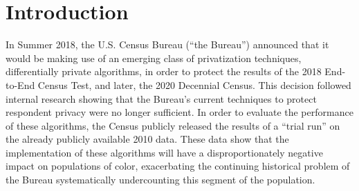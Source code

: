 \section{Introduction} \label{sec:intro}

In Summer 2018, the U.S. Census Bureau (``the Bureau'') announced that it would be making use of an emerging class of privatization techniques, differentially private algorithms, in order to protect the results of the 2018 End-to-End Census Test, and later, the 2020 Decennial Census. This decision followed internal research showing that the Bureau's current techniques to protect respondent privacy were no longer sufficient. In order to evaluate the performance of these algorithms, the Census publicly released the results of a ``trial run'' on the already publicly available 2010 data. These data show that the implementation of these algorithms will have a disproportionately negative impact on populations of color, exacerbating the continuing historical problem of the Bureau systematically undercounting this segment of the population.
